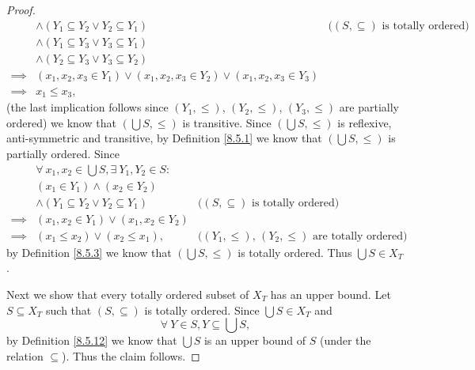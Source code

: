 \begin{proof}
\begin{align*}
                 & \land (Y_1 \subseteq Y_2 \lor Y_2 \subseteq Y_1)                                  & \text{(\((S, \subseteq)\) is totally ordered)} \\
                 & \land (Y_1 \subseteq Y_3 \lor Y_3 \subseteq Y_1)                                                                                   \\
                 & \land (Y_2 \subseteq Y_3 \lor Y_3 \subseteq Y_2)                                                                                   \\
        \implies & (x_1, x_2, x_3 \in Y_1) \lor (x_1, x_2, x_3 \in Y_2) \lor (x_1, x_2, x_3 \in Y_3)                                                  \\
        \implies & x_1 \leq x_3,
    \end{align*}
    (the last implication follows since \((Y_1, \leq)\), \((Y_2, \leq)\), \((Y_3, \leq)\) are partially ordered)
    we know that \((\bigcup S, \leq)\) is transitive.
    Since \((\bigcup S, \leq)\) is reflexive, anti-symmetric and transitive, by Definition \ref{8.5.1} we know that \((\bigcup S, \leq)\) is partially ordered.
    Since
    \begin{align*}
                 & \forall\ x_1, x_2 \in \bigcup S, \exists\ Y_1, Y_2 \in S :                                                                 \\
                 & (x_1 \in Y_1) \land (x_2 \in Y_2)                                                                                          \\
                 & \land (Y_1 \subseteq Y_2 \lor Y_2 \subseteq Y_1)           & \text{(\((S, \subseteq)\) is totally ordered)}                \\
        \implies & (x_1, x_2 \in Y_1) \lor (x_1, x_2 \in Y_2)                                                                                 \\
        \implies & (x_1 \leq x_2) \lor (x_2 \leq x_1),                        & \text{(\((Y_1, \leq)\), \((Y_2, \leq)\) are totally ordered)}
    \end{align*}
    by Definition \ref{8.5.3} we know that \((\bigcup S, \leq)\) is totally ordered.
    Thus \(\bigcup S \in X_T\).

    Next we show that every totally ordered subset of \(X_T\) has an upper bound.
    Let \(S \subseteq X_T\) such that \((S, \subseteq)\) is totally ordered.
    Since \(\bigcup S \in X_T\) and
    \[
        \forall\ Y \in S, Y \subseteq \bigcup S,
    \]
    by Definition \ref{8.5.12} we know that \(\bigcup S\) is an upper bound of \(S\) (under the relation \(\subseteq\)).
    Thus the claim follows.


\end{proof}
